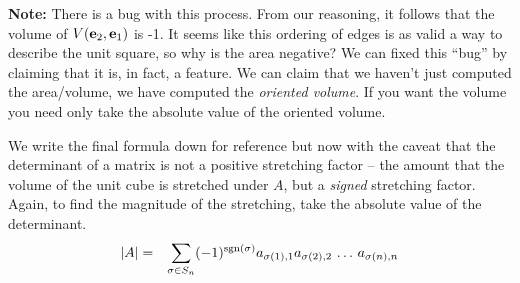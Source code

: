 \documentclass{article}
\begin{document}
{\bf Note:\/} There is a bug with this process. From our reasoning, it follows that
the volume of $V({\bf e}_2, {\bf e}_1)$ is -1. It seems like this ordering 
of edges is as valid a way to
describe the unit square, so why is the area negative? We can fixed this ``bug'' by
claiming that it is, in fact, a feature. We can claim that we haven't just
computed the area/volume,
we have computed the {\em oriented volume\/}.
If you want the volume you need only take the absolute value of the oriented volume.

We write the final formula down for reference but now with the caveat that
the determinant of a matrix is not a positive stretching factor -- the amount that the
volume of the unit cube is stretched under $A$, but a {\em signed\/} stretching
factor. Again, to find the magnitude of the stretching, take the absolute value
of the determinant.
\begin{eqnarray}
  |A| & = & \sum_{\sigma \in S_n} (-1)^{{\rm sgn}(\sigma)}
            a_{\sigma(1), 1} a_{\sigma(2),2} \, \ldots \, a_{\sigma(n), n} \label{det_formula}
\end{eqnarray}
\end{document}
